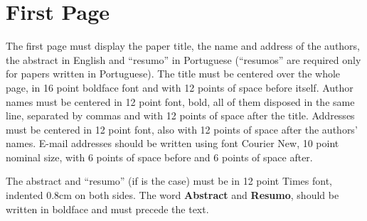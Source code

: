     \section{First Page} \label{sec:firstpage}

    The first page must display the paper title, the name and address of the
    authors, the abstract in English and ``resumo'' in Portuguese (``resumos'' are
    required only for papers written in Portuguese). The title must be centered
    over the whole page, in 16 point boldface font and with 12 points of space
    before itself. Author names must be centered in 12 point font, bold, all of
    them disposed in the same line, separated by commas and with 12 points of
    space after the title. Addresses must be centered in 12 point font, also with
    12 points of space after the authors' names. E-mail addresses should be
    written using font Courier New, 10 point nominal size, with 6 points of space
    before and 6 points of space after.

    The abstract and ``resumo'' (if is the case) must be in 12 point Times font,
    indented 0.8cm on both sides. The word \textbf{Abstract} and \textbf{Resumo},
    should be written in boldface and must precede the text.
